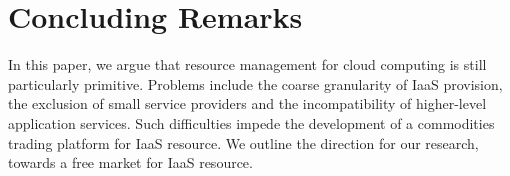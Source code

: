 \documentclass[conference,10pt]{IEEEtran}
\begin{document}
\section{Concluding Remarks}
\label{sec-concl}

In this paper, we argue that resource management for cloud computing is still particularly primitive. 
Problems include the coarse granularity of IaaS provision, the exclusion of small service providers and the incompatibility of higher-level application services.
Such difficulties impede the development of a commodities trading platform for IaaS resource. 
We outline the direction for our research, towards a free market for IaaS resource.





\end{document}
